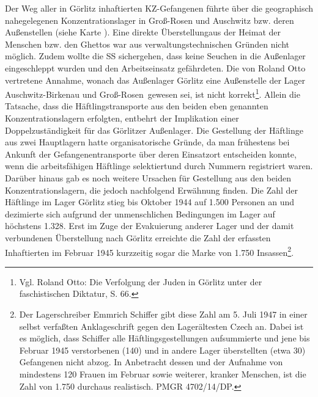 Der Weg aller in Görlitz inhaftierten KZ-Gefangenen führte über die geographisch nahegelegenen Konzentrationslager in Groß-Rosen und Auschwitz bzw. deren Außenstellen (siehe Karte ). Eine direkte \glqq Überstellung\grqq aus der Heimat der Menschen bzw. den Ghettos war aus verwaltungstechnischen Gründen nicht möglich. Zudem wollte die SS sichergehen, dass keine Seuchen in die Außenlager eingeschleppt wurden und den Arbeitseinsatz gefährdeten.
\newline
Die von Roland Otto vertretene Annahme, wonach das Außenlager Görlitz eine \glqq Außenstelle der Lager Auschwitz-Birkenau und Groß-Rosen\grqq~gewesen sei, ist nicht korrekt\footnote{Vgl. Roland Otto: Die Verfolgung der Juden in Görlitz unter der faschistischen Diktatur, S. 66.}. Allein die Tatsache, dass die Häftlingstransporte aus den beiden eben genannten Konzentrationslagern erfolgten, entbehrt der Implikation einer Doppelzuständigkeit für das Görlitzer Außenlager.
\newline
Die Gestellung der Häftlinge aus zwei Hauptlagern hatte organisatorische Gründe, da man frühestens bei Ankunft der Gefangenentransporte über deren Einsatzort entscheiden konnte, wenn die arbeitsfähigen Häftlinge \glqq selektiert\grqq und durch Nummern registriert waren. Darüber hinaus gab es noch weitere Ursachen für Gestellung aus den beiden Konzentrationslagern, die jedoch nachfolgend Erwähnung finden.
\newline
Die Zahl der Häftlinge im Lager Görlitz stieg bis Oktober 1944 auf 1.500 Personen an und dezimierte sich aufgrund der unmenschlichen Bedingungen im Lager auf höchstens 1.328. Erst im Zuge der Evakuierung anderer Lager und der damit verbundenen Überstellung nach Görlitz erreichte die Zahl der erfassten Inhaftierten im Februar 1945 kurzzeitig sogar die Marke von 1.750 Insassen\footnote{Der Lagerschreiber Emmrich Schiffer gibt diese Zahl am 5. Juli 1947 in einer selbst verfaßten Anklageschrift gegen den Lagerältesten Czech an. Dabei ist es möglich, dass Schiffer alle Häftlingsgestellungen aufsummierte und jene bis Februar 1945 verstorbenen (140) und in andere Lager überstellten (etwa 30) Gefangenen nicht abzog. In Anbetracht dessen und der Aufnahme von mindestens 120 Frauen im Februar sowie weiterer, kranker Menschen, ist die Zahl von 1.750 durchaus realistisch. PMGR 4702/14/DP.}.



